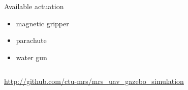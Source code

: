 \documentclass[aspectratio=169,9pt]{beamer}
\newcommand{\mymovie}[3][]{\pdfpcmovie[#1]{#2}{#3}}
\begin{document}
\begin{frame}
\begin{columns}[c]

      \begin{block}{Available actuation}
        \begin{itemize}
          \item magnetic gripper
          \item parachute
          \item water gun
        \end{itemize}
      \end{block}

    \end{columns}

    \begin{center}
      \url{http://github.com/ctu-mrs/mrs_uav_gazebo_simulation}
    \end{center}

  \end{frame}







\end{document}
